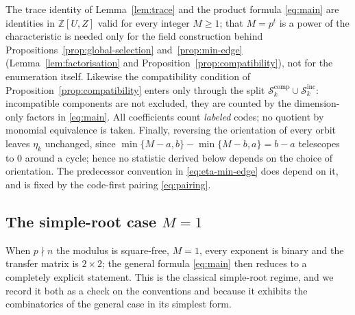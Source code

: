 \begin{remark}
\label{rem:hypotheses}
The trace identity of Lemma~\ref{lem:trace} and the product formula
\eqref{eq:main} are identities in $\mathbb{Z}[U,Z]$ valid for every integer
$M\geq1$; that $M=p^t$ is a power of the characteristic is needed only for the
field construction behind Propositions~\ref{prop:global-selection}
and~\ref{prop:min-edge} (Lemma~\ref{lem:factorisation}
and Proposition~\ref{prop:compatibility}), not for the enumeration itself. Likewise the
compatibility condition of Proposition~\ref{prop:compatibility} enters only
through the split $\mathcal{S}_k^{\mathrm{comp}}\cup\mathcal{S}_k^{\mathrm{inc}}$:
incompatible components are not excluded, they are counted by the
dimension-only factors in \eqref{eq:main}. All coefficients count \emph{labeled}
codes; no quotient by monomial equivalence is taken. Finally, reversing the
orientation of every orbit leaves $\eta_k$ unchanged, since
$\min\{M-a,b\}-\min\{M-b,a\}=b-a$ telescopes to $0$ around a cycle; hence no
statistic derived below depends on the choice of orientation. The predecessor
convention in \eqref{eq:eta-min-edge} does depend on it, and is fixed by the
code-first pairing \eqref{eq:pairing}.
\end{remark}

\subsection{The simple-root case \texorpdfstring{$M=1$}{M=1}}\label{sec:M1}

When $p\nmid n$ the modulus is square-free, $M=1$, every exponent is binary and
the transfer matrix is $2\times2$; the general formula
\eqref{eq:main} then reduces to a completely explicit statement. This is the
classical simple-root regime, and we record it both as a check on the
conventions and because it exhibits the combinatorics of the general case in
its simplest form.


